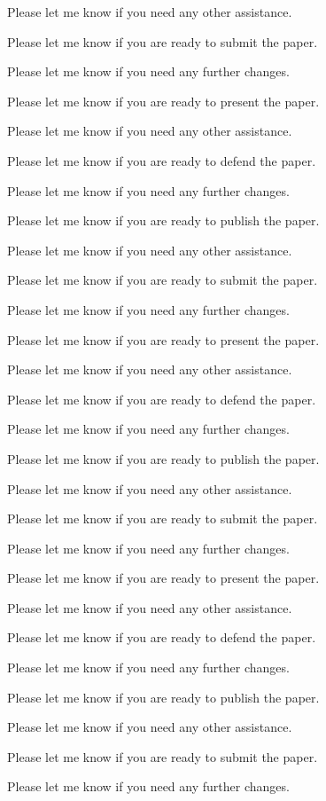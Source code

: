 Please let me know if you need any other assistance. 

Please let me know if you are ready to submit the paper. 

Please let me know if you need any further changes. 

Please let me know if you are ready to present the paper. 

Please let me know if you need any other assistance. 

Please let me know if you are ready to defend the paper. 

Please let me know if you need any further changes. 

Please let me know if you are ready to publish the paper. 

Please let me know if you need any other assistance. 

Please let me know if you are ready to submit the paper. 

Please let me know if you need any further changes. 

Please let me know if you are ready to present the paper. 

Please let me know if you need any other assistance. 

Please let me know if you are ready to defend the paper. 

Please let me know if you need any further changes. 

Please let me know if you are ready to publish the paper. 

Please let me know if you need any other assistance. 

Please let me know if you are ready to submit the paper. 

Please let me know if you need any further changes. 

Please let me know if you are ready to present the paper. 

Please let me know if you need any other assistance. 

Please let me know if you are ready to defend the paper. 

Please let me know if you need any further changes. 

Please let me know if you are ready to publish the paper. 

Please let me know if you need any other assistance. 

Please let me know if you are ready to submit the paper. 

Please let me know if you need any further changes. 

